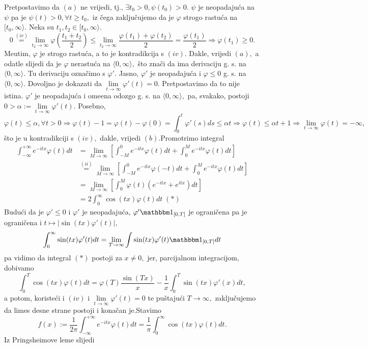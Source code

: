 \documentclass{article}
\begin{document}
Pretpostavimo da \((a)\) ne vrijedi, tj., \(\exists t_0>0,\psi(t_0)>0.\) \(\psi\) je neopadajuća na \(\psi\) pa je \(\psi(t)>0,\forall t\ge t_0,\) iz čega zaključujemo da je \(\varphi\) strogo rastuća na \([t_0,\infty\rangle.\) Neka su \(t_1,t_2\in[t_0,\infty\rangle.\) \[0\overset{(iv)}{=}\lim_{t_2\to\infty}\varphi\left(\frac{t_1+t_2}2\right)\le\lim_{t_2\to\infty}\frac{\varphi(t_1)+\varphi(t_2)}2=\frac{\varphi(t_1)}2\Rightarrow\varphi(t_1)\ge0.\] Me\dj{}utim, \(\varphi\) je strogo rastuća, a to je kontradikcija s \((iv).\) Dakle, vrijedi \((a),\) a odatle slijedi da je \(\varphi\) nerastuća na \(\langle0,\infty\rangle,\) što znači da ima derivaciju g. s.  na \(\langle0,\infty\rangle.\) Tu derivaciju označimo s \(\varphi'.\) Jasno, \(\varphi'\) je neopadajuća i \(\varphi\le0\) g. s. na \(\langle0,\infty\rangle.\) Dovoljno je dokazati da \(\lim\limits_{t\to\infty}\varphi'(t)=0.\) Pretpostavimo da to nije istina. \(\varphi'\) je neopadajuća i ome\dj{}ena odozgo g. s. na \(\langle0,\infty\rangle,\) pa, svakako, postoji \(0>\alpha:=\lim\limits_{t\to\infty}\varphi'(t).\) Posebno, \[\varphi(t)\le\alpha,\forall t>0\Rightarrow\varphi(t)-1=\varphi(t)-\varphi(0)=\int_0^t\varphi'(s)ds\le\alpha t\Rightarrow\varphi(t)\le\alpha t+1\Rightarrow\lim_{t\to\infty}\varphi(t)=-\infty,\] što je u kontradikciji s \((iv),\) dakle, vrijedi \((b).\)\newline\newline Promotrimo integral \[\begin{aligned}\int_{-\infty}^{+\infty}e^{-itx}\varphi(t)dt&=\lim_{M\to\infty}\left[\int_{-M}^0e^{-itx}\varphi(t)dt+\int_0^Me^{-itx}\varphi(t)dt\right]\\&\overset{(ii)}{=}\lim_{M\to\infty}\left[\int_{-M}^0e^{-itx}\varphi(-t)dt+\int_0^Me^{-itx}\varphi(t)dt\right]\\&=\lim_{M\to\infty}\left[\int_0^M\varphi(t)\left(e^{-itx}+e^{itx}\right)dt\right]\\&=2\int_0^\infty\cos(tx)\varphi(t)dt\;(*)\end{aligned}\] Budući da je \(\varphi'\le0\) i \(\varphi'\) je neopadajuća, \(\varphi'\mathbbm 1_{[0,T]}\) je ograničena pa je ograničena i \(t\mapsto|\sin(tx)\varphi'(t)|,\) \[\int_0^\infty\sin(tx)\varphi'(t)dt=\lim_{T\to\infty}\int\sin(tx)\varphi'(t)\mathbbm 1_{[0,T]}dt\] pa vidimo da integral \((*)\) postoji za \(x\ne 0,\) jer, parcijalnom integracijom, dobivamo \[\int_0^T\cos(tx)\varphi(t)dt=\varphi(T)\frac{\sin(Tx)}x-\frac1x\int_0^T\sin(tx)\varphi'(x)dt,\] a potom, koristeći i \((iv)\) i \(\lim\limits_{t\to\infty}\varphi'(t)=0\) te puštajući \(T\to\infty,\) zaključujemo da limes desne strane postoji i konačan je.\newline\newline Stavimo \[f(x):=\frac1{2\pi}\int_{-\infty}^{+\infty}e^{-itx}\varphi(t)dt=\frac1\pi\int_0^\infty\cos(tx)\varphi(t)dt.\] Iz Pringsheimove leme slijedi 
\end{document}
